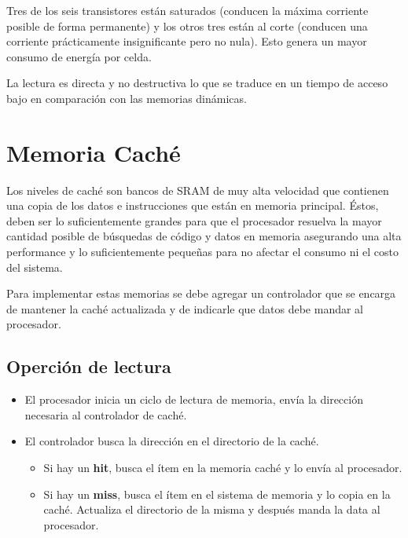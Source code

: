 \begin{itemize}
\begin{itemize}
 		Tres de los seis transistores están saturados (conducen la máxima corriente posible de forma permanente) y los otros tres están al corte (conducen una corriente prácticamente insignificante pero no nula). Esto genera un mayor consumo de energía por celda.
 		
 		La lectura es directa y no destructiva lo que se traduce en un tiempo de acceso bajo en comparación con las memorias dinámicas.
	\end{itemize}

\end{itemize}

\newpage
\section{Memoria Caché}
Los niveles de caché son bancos de SRAM de muy alta velocidad que contienen una copia de los datos e instrucciones que están en memoria principal. Éstos, deben ser lo suficientemente grandes para que el procesador resuelva la mayor cantidad posible de búsquedas de código y datos en memoria asegurando una alta performance y lo suficientemente pequeñas para no afectar el consumo ni el costo del sistema.

Para implementar estas memorias se debe agregar un controlador que se encarga de mantener la caché actualizada y de indicarle que datos debe mandar al procesador.

\subsection{Operción de lectura}
\begin{itemize}
	\item El procesador inicia un ciclo de lectura de memoria, envía la dirección necesaria al controlador de caché.
	\item El controlador busca la dirección en el directorio de la caché.
	\begin{itemize}
		\item Si hay un \textbf{hit}, busca el ítem en la memoria caché y lo envía al procesador.
		\item Si hay un \textbf{miss},  busca el ítem en el sistema de memoria y lo copia en la caché. Actualiza el directorio de la misma y después manda la data al procesador.
	\end{itemize}
\end{itemize}

